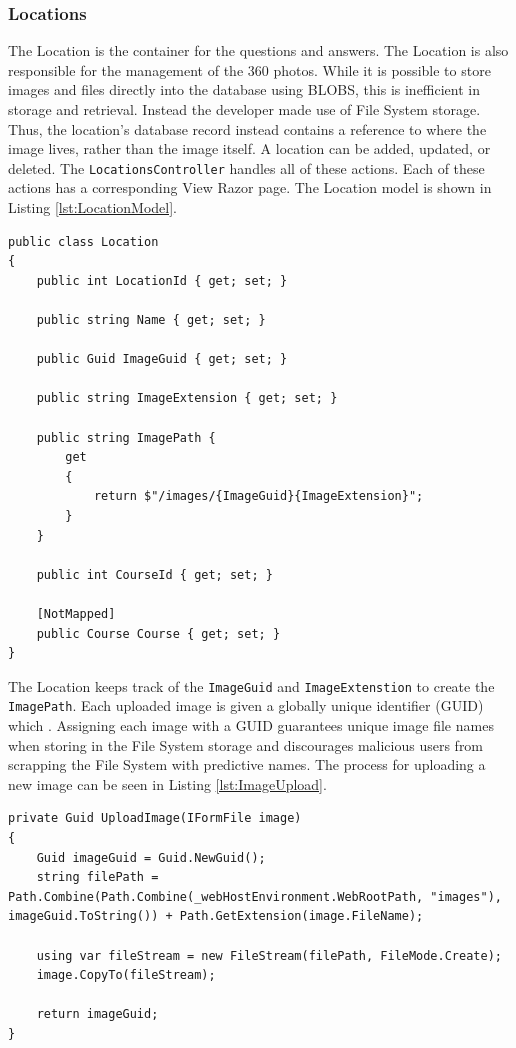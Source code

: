 \subsubsection{Locations}
The Location is the container for the questions and answers. The Location is also responsible for the management of the 360 photos. While it is possible to store images and files directly into the database using BLOBS, this is inefficient in storage and retrieval. Instead the developer made use of File System storage. Thus, the location's database record instead contains a reference to where the image lives, rather than the image itself. A location can be added, updated, or deleted. The \lstinline{LocationsController} handles all of these actions. Each of these actions has a corresponding View Razor page. The Location model is shown in Listing \ref{lst:LocationModel}.
\begin{lstlisting}[caption=Location Model, label=lst:LocationModel]
public class Location
{
	public int LocationId { get; set; }
	
	public string Name { get; set; }
	
	public Guid ImageGuid { get; set; }
	
	public string ImageExtension { get; set; }
	
	public string ImagePath {
		get
		{
			return $"/images/{ImageGuid}{ImageExtension}";
		}
	}

	public int CourseId { get; set; }
	
	[NotMapped]
	public Course Course { get; set; }
}
\end{lstlisting}

The Location keeps track of the \lstinline{ImageGuid} and \lstinline{ImageExtenstion} to create the \lstinline{ImagePath}. Each uploaded image is given a globally unique identifier (GUID) which . Assigning each image with a GUID guarantees unique image file names when storing in the File System storage and discourages malicious users from scrapping the File System with predictive names. The process for uploading a new image can be seen in Listing \ref{lst:ImageUpload}.
\begin{lstlisting}[caption=Uploading an Image, label=lst:ImageUpload]
private Guid UploadImage(IFormFile image)
{
	Guid imageGuid = Guid.NewGuid();
	string filePath = Path.Combine(Path.Combine(_webHostEnvironment.WebRootPath, "images"), imageGuid.ToString()) + Path.GetExtension(image.FileName);
	
	using var fileStream = new FileStream(filePath, FileMode.Create);
	image.CopyTo(fileStream);
	
	return imageGuid;
}
\end{lstlisting} 

